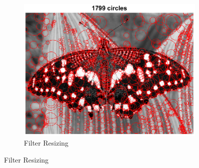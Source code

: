 \documentclass{article}
\newcommand{\tl}[1]{\textlatin{#1}}
\begin{document}
\begin{figure}[H]
		\begin{subfigure}[b]{0.37\textwidth}
			\includegraphics[width=\textwidth]{res/butterfly_blob.eps}	
			\caption{\tl{Filter Resizing}}	
		\end{subfigure}%
	\end{figure}
\end{document}
